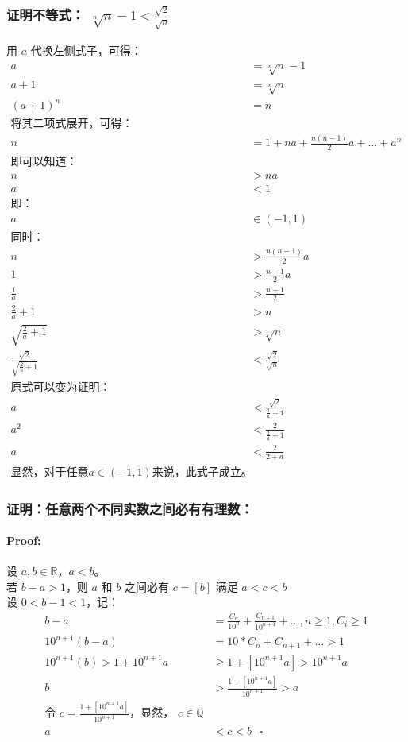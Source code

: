 \documentclass{article}
\begin{document}
\subsubsection{证明不等式： $\sqrt[n]{n} - 1 < \frac{\sqrt{2}}{\sqrt{n}}$}
用 $a$ 代换左侧式子，可得：
\begin{align*}
    a &= \sqrt[n]{n} - 1 \\
    a + 1 &= \sqrt[n]{n} \\
    (a + 1)^n &= n \\
    \text{将其二项式展开，可得：} \\
    n &= 1 + na + \frac{n(n-1)}{2}a + \dots + a^n \\
    \text{即可以知道：} \\
    n &> na \\ 
    a &< 1 \\
    \text{即：} \\
    a &\in (-1, 1) \\
    \text{同时：} \\
    n &> \frac{n(n-1)}{2}a \\
    1 &> \frac{n-1}{2}a \\
    \frac{1}{a} &> \frac{n-1}{2} \\
    \frac{2}{a} + 1 &> n \\
    \sqrt{\frac{2}{a} + 1} &> \sqrt{n} \\
    \frac{\sqrt{2}}{\sqrt{\frac{2}{a} + 1}} &< \frac{\sqrt{2}}{\sqrt{n}} \\
    \text{原式可以变为证明：} \\
    a &< \frac{\sqrt{2}}{\frac{2}{a} + 1} \\
    a^2 &< \frac{2}{\frac{2}{a} + 1} \\
    a &< \frac{2}{2 + a} \\
    \text{显然，对于任意$a \in (-1, 1)$来说，此式子成立。 } \square
\end{align*}
\subsubsection{证明：任意两个不同实数之间必有有理数：}
\paragraph{Proof:}
设 $a, b \in \mathbb{R}$，\land $a < b$。\\
若 $b - a > 1$，则 $a$ 和 $b$ 之间必有 $c = [b]$ 满足 $a < c < b$ \\
设 $0 < b - 1 < 1$，记：
\begin{align*}
    b - a &= \frac{C_n}{10^n} + \frac{C_{n + 1}}{10^{n + 1}} + \dots, n \geq 1, C_{i} \geq 1 \\
    10^{n + 1}(b - a) &= 10 * C_n + C_{n + 1} + \dots > 1 \\
    10^{n + 1}(b) > 1 + 10^{n + 1}a &\geq 1 + [10^{n + 1}a] > 10^{n + 1}a \\
    b &> \frac{1 + [10^{n + 1}a]}{10^{n + 1}} > a \\
    \text{令 $c = \frac{1 + [10^{n + 1}a]}{10^{n + 1}}$，显然， $c \in \mathbb{Q}$} \\
    a &< c < b \text{ } \square
\end{align*}
\end{document}

